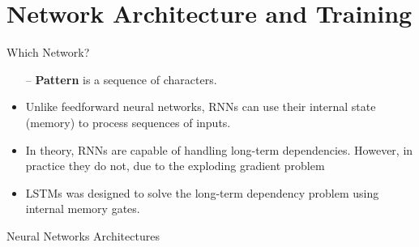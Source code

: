 \section{Network Architecture and Training}

\begin{frame}[fragile]{Which Network?}


		\begin{itemize}
			\item[--] \textbf{Pattern} is a sequence of characters.
			\item  Unlike feedforward neural networks, RNNs can use their internal state (memory) to process sequences of inputs.
			\item In theory, RNNs are capable of handling long-term dependencies. 	However, in practice they do not, due to the \alert{exploding gradient problem}
			\item LSTMs was designed to solve the long-term dependency problem using internal memory gates.
		\end{itemize}
		
\end{frame}
\begin{frame}[fragile]{Neural Networks Architectures}


\end{frame}

